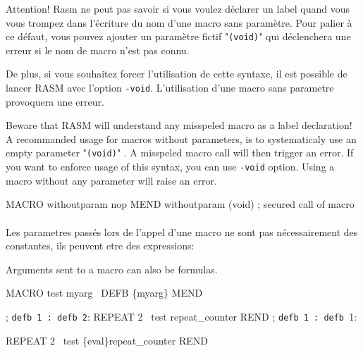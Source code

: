 \begin{xfr}
Attention! Rasm ne peut pas savoir si vous voulez déclarer un label quand vous vous trompez dans l'écriture du nom d'une macro sans paramètre.
Pour palier à ce défaut, vous pouvez ajouter un paramètre fictif "\texttt{(void)}"  qui déclenchera une erreur si le nom de macro n'est pas connu.

De plus, si vous souhaitez forcer l'utilisation de cette syntaxe, il est possible de lancer RASM avec l'option \texttt{-void}.
L'utilisation d'une macro sans parametre provoquera une erreur.
\end{xfr}

\begin{xen}
Beware that RASM will understand any misspeled macro as a label declaration!
A recommanded usage for macros without parameters, is to systematicaly use an empty parameter "\texttt{(void)}" .
A misspeled macro call will then trigger an error.
If you want to enforce usage of this syntax, you can use \texttt{-void} option. Using a macro without any parameter will raise an error.

\end{xen}

\begin{code}
MACRO withoutparam
nop
MEND
withoutparam (void) ; secured call of macro
\end{code}

\paragraph{}

\begin{xfr}
Les parametres passés lors de l'appel d'une macro ne sont pas nécessairement des constantes, ils peuvent etre des expressions:
\end{xfr}

\begin{xen}
Arguments sent to a macro can also be formulas. %
\end{xen}

\begin{code}
MACRO test myarg
\ DEFB \{myarg\}
MEND

; \texttt{defb 1 : defb 2}:
REPEAT 2
\ test repeat\_counter
REND
; \texttt{defb 1 : defb }1:

REPEAT 2
\ test \{eval\}repeat\_counter
REND
\end{code}
